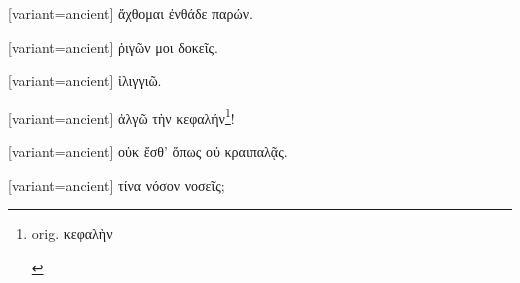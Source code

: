 %
%

\switchcolumn

\begin{greek}[variant=ancient]%
ἄχθομαι ἐνθάδε παρών.

\end{greek}%
\switchcolumn*

%
%

\switchcolumn

\begin{greek}[variant=ancient]%
ῥιγῶν μοι δοκεῖς.

\end{greek}%
\switchcolumn*

%
%

\switchcolumn

\begin{greek}[variant=ancient]%
ἰλιγγιῶ.

\end{greek}%
\switchcolumn*

%
%

\switchcolumn

\begin{greek}[variant=ancient]%
ἀλγῶ τὴν κεφαλήν\footnote{\begin{latin}%
orig. \textgreek[variant=ancient]{κεφαλὴν}\end{latin}%
}!

\end{greek}%
\switchcolumn*

%
%

\switchcolumn

\begin{greek}[variant=ancient]%
οὐκ ἔσθ' ὅπως οὐ κραιπαλᾷς.

\end{greek}%
\switchcolumn*

%
%

\switchcolumn

\begin{greek}[variant=ancient]%
τίνα νόσον νοσεῖς;

\end{greek}%
\switchcolumn*

%
%

